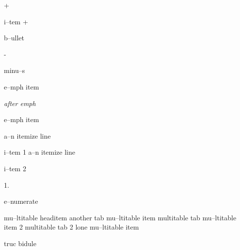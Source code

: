 \documentclass{book}
\begin{document}
\begin{titlepage}
+ 

i--tem +

\textbullet{} 

b--ullet

- 

minu--s

\emph{} 

e--mph item

\emph{after emph} 

e--mph item

\textbullet{} a--n itemize line 

i--tem 1
\textbullet{} a--n itemize line 

i--tem 2

1. 

e--numerate

mu--ltitable headitem another tab
mu--ltitable item multitable tab
mu--ltitable item 2 multitable tab 2
lone mu--ltitable item

truc bidule


\end{titlepage}
\end{document}
